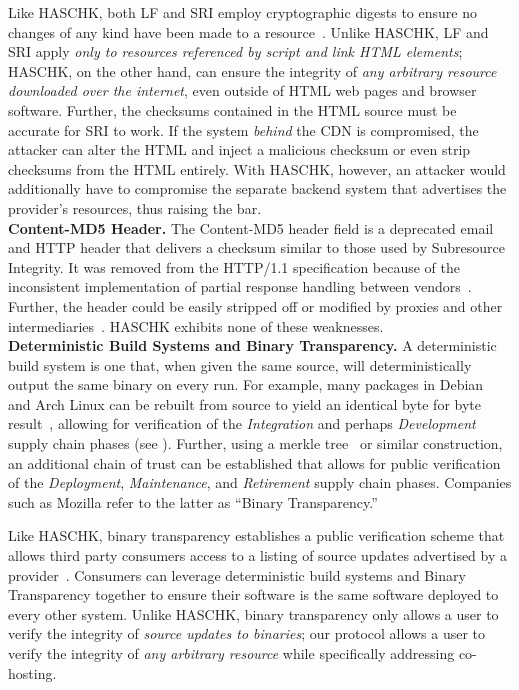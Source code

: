 Like HASCHK, both LF and SRI employ cryptographic digests to ensure no
changes of any kind have been made to a resource~\cite{SRI}. Unlike HASCHK,
LF and SRI apply \emph{only to resources referenced by script and link HTML
elements}; HASCHK, on the other hand, can ensure the integrity of \emph{any
arbitrary resource downloaded over the internet}, even outside of HTML web pages
and browser software. Further, the checksums contained in the HTML source must
be accurate for SRI to work. If the system \emph{behind} the CDN is compromised,
the attacker can alter the HTML and inject a malicious checksum or even strip
checksums from the HTML entirely. With HASCHK, however, an attacker would
additionally have to compromise the separate backend system that advertises the
provider's resources, thus raising the bar. \\

\noindent\textbf{Content-MD5 Header.} The Content-MD5 header field is a
deprecated email and HTTP header that delivers a checksum similar to those used
by Subresource Integrity. It was removed from the HTTP/1.1 specification because
of the inconsistent implementation of partial response handling between
vendors~\cite{HTTP1.1}. Further, the header could be easily stripped off or
modified by proxies and other intermediaries~\cite{MD5Header}. HASCHK
exhibits none of these weaknesses. \\

\noindent\textbf{Deterministic Build Systems and Binary Transparency.} A
deterministic build system is one that, when given the same source, will
deterministically output the same binary on every run. For example, many
packages in Debian~\cite{ReproBuildsDebian} and Arch Linux can be rebuilt from
source to yield an identical byte for byte result~\cite{ReproBuilds}, allowing
for verification of the \emph{Integration} and perhaps \emph{Development} supply
chain phases (see ). Further, using a merkle
tree~\cite{MerkleTree} or similar construction, an additional chain of trust can
be established that allows for public verification of the \emph{Deployment},
\emph{Maintenance}, and \emph{Retirement} supply chain phases. Companies such as
Mozilla refer to the latter as ``Binary Transparency.''

Like HASCHK, binary transparency establishes a public verification scheme
that allows third party consumers access to a listing of source updates
advertised by a provider~\cite{BinaryTransparency}. Consumers can leverage
deterministic build systems and Binary Transparency together to ensure their
software is the same software deployed to every other system. Unlike HASCHK,
binary transparency only allows a user to verify the integrity of \emph{source
updates to binaries}; our protocol allows a user to verify the integrity of
\emph{any arbitrary resource} while specifically addressing co-hosting. \\

